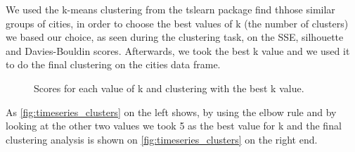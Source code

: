 We used the k-means clustering from the tslearn package find thhose similar groups of cities, in order to choose the best values of k (the number of clusters) we based our choice, as seen during the clustering task, on the SSE, silhouette and Davies-Bouldin scores. Afterwards, we took the best k value and we used it to do the final clustering on the cities data frame.
\begin{figure}[H]
    \centering
    \caption{Scores for each value of k and clustering with the best k value.}
    \label{fig:timeseries_clusters}
\end{figure}
As \autoref{fig:timeseries_clusters} on the left shows, by using the elbow rule and by looking at the other two values we took 5 as the best value for k and the final clustering analysis is shown on \autoref{fig:timeseries_clusters} on the right end.\\

